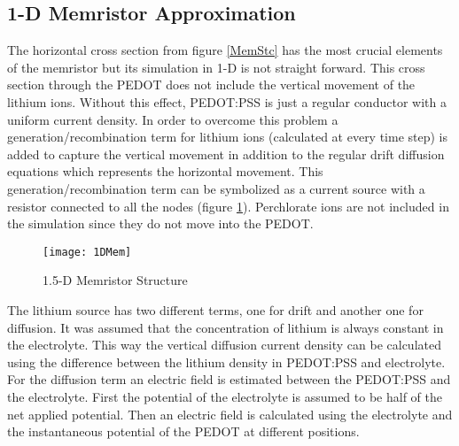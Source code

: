 \begin{doublespace}
\clearpage
\section{1-D Memristor Approximation}

The horizontal cross section from figure \ref{MemStc} has the most crucial elements of the memristor but its simulation in 1-D is not straight forward. This cross section through the PEDOT does not include the vertical movement of the lithium ions. Without this effect, PEDOT:PSS is just a regular conductor with a uniform current density. In order to overcome this problem a generation/recombination term for lithium ions (calculated at every time step) is added to capture the vertical movement in addition to the regular drift diffusion equations which represents the horizontal movement. This generation/recombination term can be symbolized as a current source with a resistor connected to all the nodes (figure \ref{MemStc15}). Perchlorate ions are not included in the simulation since they do not move into the PEDOT.

\begin{figure}[!htp]
\centering
\texttt{[image: 1DMem]}
\caption{1.5-D Memristor Structure} 
\label{MemStc15}
\end{figure}

The lithium source has two different terms, one for drift and another one for diffusion. It was assumed that the concentration of lithium is always constant in the electrolyte. This way the vertical diffusion current density can be calculated using the difference between the lithium density in PEDOT:PSS and electrolyte. For the diffusion term an electric field is estimated between the PEDOT:PSS and the electrolyte. First the potential of the electrolyte is assumed to be half of the net applied potential. Then an electric field is calculated using the electrolyte and the instantaneous potential of the PEDOT at different positions.



\end{doublespace}
